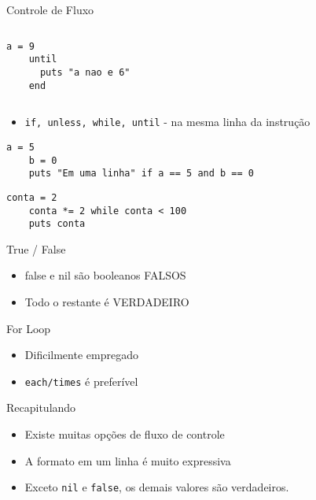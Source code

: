 \begin{frame}{Controle de Fluxo}
\begin{columns}
\begin{column}{0.5\textwidth}
\begin{lstlisting}[style=RubyInputStyle]
    a = 9
    until
      puts "a nao e 6"
    end 
      \end{lstlisting}
    \end{column}
  \end{columns}
\pagebreak
  \begin{itemize}
    \item \verb!if, unless, while, until! - na mesma linha da instrução
  \end{itemize}   
      \begin{lstlisting}[style=RubyInputStyle]
    a = 5
    b = 0
    puts "Em uma linha" if a == 5 and b == 0
      \end{lstlisting}  
      \begin{lstlisting}[style=RubyInputStyle]
    conta = 2 
    conta *= 2 while conta < 100
    puts conta
      \end{lstlisting}
\end{frame}

\begin{frame}[fragile,t]{True / False}
  \begin{itemize}
    \item false e nil são booleanos FALSOS
    \item Todo o restante é VERDADEIRO
	
  \end{itemize}   
\end{frame}

\begin{frame}{For Loop}
  \begin{itemize}
    \item Dificilmente empregado
    \item \verb!each/times! é preferível
  \end{itemize}
  
  

\end{frame}


\begin{frame}[fragile,t]{Recapitulando}
  \begin{itemize}
    \item Existe muitas opções de fluxo de controle
    \item A formato em um linha é muito expressiva
    \item Exceto \verb!nil! e \verb!false!, os demais valores são verdadeiros.
  \end{itemize}
\end{frame}



